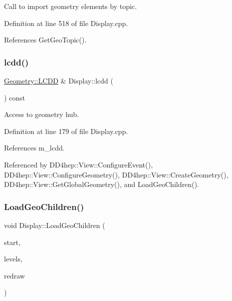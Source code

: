 Call to import geometry elements by topic. 



Definition at line 518 of file Display.\+cpp.



References Get\+Geo\+Topic().

\hypertarget{class_d_d4hep_1_1_display_a3cb697a04f6da762bb0f7801e33c590e}{}\label{class_d_d4hep_1_1_display_a3cb697a04f6da762bb0f7801e33c590e} 
\subsubsection{\texorpdfstring{lcdd()}{lcdd()}}
{\footnotesize\ttfamily \hyperlink{class_d_d4hep_1_1_geometry_1_1_l_c_d_d}{Geometry\+::\+L\+C\+DD} \& Display\+::lcdd (\begin{DoxyParamCaption}{ }\end{DoxyParamCaption}) const}



Access to geometry hub. 



Definition at line 179 of file Display.\+cpp.



References m\+\_\+lcdd.



Referenced by D\+D4hep\+::\+View\+::\+Configure\+Event(), D\+D4hep\+::\+View\+::\+Configure\+Geometry(), D\+D4hep\+::\+View\+::\+Create\+Geometry(), D\+D4hep\+::\+View\+::\+Get\+Global\+Geometry(), and Load\+Geo\+Children().

\hypertarget{class_d_d4hep_1_1_display_a4432cbc091804b89436dd88dff8484f9}{}\label{class_d_d4hep_1_1_display_a4432cbc091804b89436dd88dff8484f9} 
\subsubsection{\texorpdfstring{Load\+Geo\+Children()}{LoadGeoChildren()}}
{\footnotesize\ttfamily void Display\+::\+Load\+Geo\+Children (\begin{DoxyParamCaption}\item[{T\+Eve\+Element $\ast$}]{start,  }\item[{int}]{levels,  }\item[{bool}]{redraw }\end{DoxyParamCaption})}



